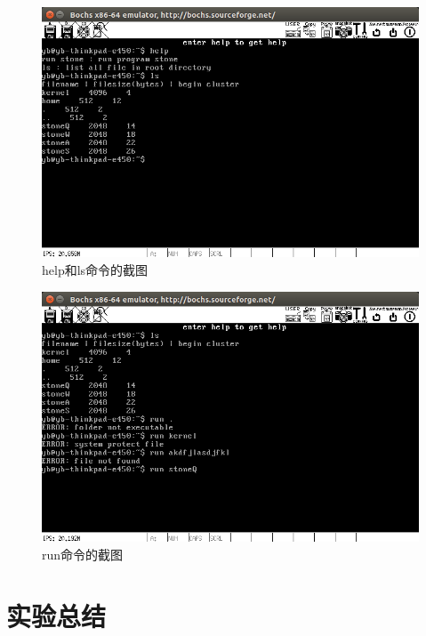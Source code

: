 \documentclass[a4paper]{article}
\begin{document}
    
    \begin{figure}[!htb]
        \begin{center}
        \includegraphics[scale=0.5]{asset/helpls.png}
        \caption{help和ls命令的截图\label{fig:helpls}} 
        \end{center} 
    \end{figure} 

    
    
    \begin{figure}[!htb]
        \begin{center}
        \includegraphics[scale=0.5]{asset/runfiles.png}
        \caption{run命令的截图\label{fig:runfiles}} 
        \end{center} 
    \end{figure} 
    
    
\section{实验总结}
\end{document}
